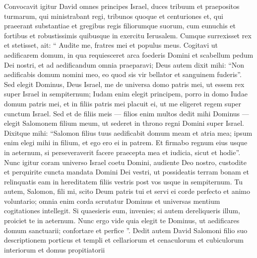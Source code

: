 \begin{biblechapter}
\begin{biblechapter}
\begin{biblechapter}
\begin{biblechapter}
\begin{biblechapter}
\begin{biblechapter}
\begin{biblechapter}
\begin{biblechapter}
\begin{biblechapter}
\begin{biblechapter}
\begin{biblechapter}
\begin{biblechapter}
\begin{biblechapter}
\begin{biblechapter}
\begin{biblechapter}
\begin{biblechapter}
\begin{biblechapter}
\begin{biblechapter}
\begin{biblechapter}
\begin{biblechapter}
\begin{biblechapter}
\begin{biblechapter}
\begin{biblechapter}
\begin{biblechapter}
\begin{biblechapter}
\begin{biblechapter}
\begin{biblechapter}
\begin{biblechapter}
\verse Convocavit igitur David omnes principes Israel, duces tribuum et praepositos turmarum, qui ministrabant regi, tribunos quoque et centuriones et, qui praeerant substantiae et gregibus regis filiorumque suorum, cum eunuchis et fortibus et robustissimis quibusque in exercitu Ierusalem. 
\verse Cumque surrexisset rex et stetisset, ait: “ Audite me, fratres mei et populus meus. Cogitavi ut aedificarem domum, in qua requiesceret arca foederis Domini et scabellum pedum Dei nostri, et ad aedificandum omnia praeparavi; 
\verse Deus autem dixit mihi: “Non aedificabis domum nomini meo, eo quod sis vir bellator et sanguinem fuderis”. 
\verse Sed elegit Dominus, Deus Israel, me de universa domo patris mei, ut essem rex super Israel in sempiternum; Iudam enim elegit principem, porro in domo Iudae domum patris mei, et in filiis patris mei placuit ei, ut me eligeret regem super cunctum Israel. 
\verse Sed et de filiis meis — filios enim multos dedit mihi Dominus — elegit Salomonem filium meum, ut sederet in throno regni Domini super Israel. 
\verse Dixitque mihi: “Salomon filius tuus aedificabit domum meam et atria mea; ipsum enim elegi mihi in filium, et ego ero ei in patrem. 
\verse Et firmabo regnum eius usque in aeternum, si perseveraverit facere praecepta mea et iudicia, sicut et hodie”. 
\verse Nunc igitur coram universo Israel coetu Domini, audiente Deo nostro, custodite et perquirite cuncta mandata Domini Dei vestri, ut possideatis terram bonam et relinquatis eam in hereditatem filiis vestris post vos usque in sempiternum.
 \verse Tu autem, Salomon, fili mi, scito Deum patris tui et servi ei corde perfecto et animo voluntario; omnia enim corda scrutatur Dominus et universas mentium cogitationes intellegit. Si quaesieris eum, invenies; si autem dereliqueris illum, proiciet te in aeternum. 
\verse Nunc ergo vide quia elegit te Dominus, ut aedificares domum sanctuarii; confortare et perfice ”.
 \verse Dedit autem David Salomoni filio suo descriptionem porticus et templi et cellariorum et cenaculorum et cubiculorum interiorum et domus propitiatorii 

\end{biblechapter}
\end{biblechapter}
\end{biblechapter}
\end{biblechapter}
\end{biblechapter}
\end{biblechapter}
\end{biblechapter}
\end{biblechapter}
\end{biblechapter}
\end{biblechapter}
\end{biblechapter}
\end{biblechapter}
\end{biblechapter}
\end{biblechapter}
\end{biblechapter}
\end{biblechapter}
\end{biblechapter}
\end{biblechapter}
\end{biblechapter}
\end{biblechapter}
\end{biblechapter}
\end{biblechapter}
\end{biblechapter}
\end{biblechapter}
\end{biblechapter}
\end{biblechapter}
\end{biblechapter}
\end{biblechapter}
